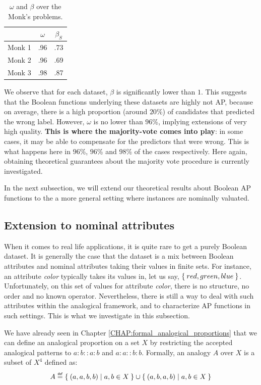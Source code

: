 \begin{table}
\centering
\begin{tabular}{ c  c  c }
\toprule
  & $\omega$  & $\beta_S$ \\
\midrule
Monk 1 & .96 & .73 \\
Monk 2 & .96 & .69 \\
Monk 3 & .98 & .87 \\
\bottomrule
\end{tabular}
\caption{$\omega$ and $\beta$ over the Monk's problems.}
\label{table_monks}
\end{table}

We observe that for each dataset, $\beta$ is significantly lower than $1$.
This suggests that the Boolean functions underlying these datasets are highly
not AP, because on average, there is a high proportion (around $20$\%) of
candidates that predicted the wrong label. However, $\omega$ is no lower than
$96$\%, implying extensions of very high quality.  \textbf{This is where the
majority-vote comes into play}: in some cases, it may be able to compensate for
the predictors that were wrong.  This is what happens here in $96$\%, $96$\%
and $98$\% of the cases respectively. Here again, obtaining theoretical
guarantees about the majority vote procedure is currently investigated.

In the next subsection, we will extend our theoretical results about Boolean AP
functions to the a more general setting where instances are nominally valuated.

\subsection{Extension to nominal attributes}
\label{SEC:extension_to_nominal_attributes}

When it comes to real life applications, it is quite rare to get a purely
Boolean dataset.  It is generally the case that the dataset  is  a mix between
Boolean attributes and nominal attributes taking their values in finite sets.
For instance, an attribute \textit{color} typically takes its values in, let us
say, $\Set{red, green,blue}$. Unfortunately, on this set of values for attribute
\textit{color}, there is no structure, no order and no known operator.
Nevertheless, there is still a way to deal with such attributes within the
analogical framework, and to characterize AP functions in such settings. This
is what we investigate in this subsection.
 

We have already seen in Chapter \ref{CHAP:formal_analogical_proportions} that we
can define an analogical proportion on a set $X$ by restricting the accepted
analogical patterns to $a:b::a:b$ and $a:a::b:b$.  Formally, an analogy $A$
over $X$ is a subset of $X^4$ defined as:
$$A \eqdef \Set{ (a,a,b,b)  | a, b \in X} \cup \Set{ (a,b,a,b) | a, b \in X}$$

